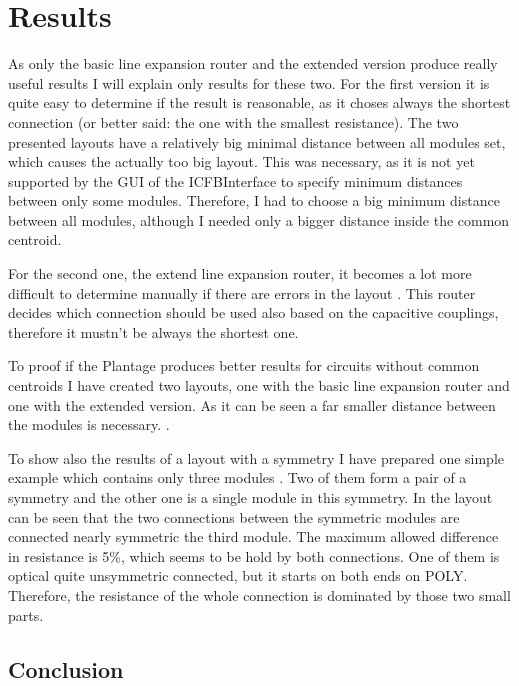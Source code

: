 \chapter{Results}
As only the basic line expansion router and the extended version produce really useful results I will explain only results for these two. For the first version  it is quite easy to determine if the result is reasonable, as it choses always the shortest connection (or better said: the one with the smallest resistance). The two presented layouts have a relatively big minimal distance between all modules set, which causes the actually too big layout. This was necessary, as it is not yet supported by the GUI of the ICFBInterface to specify minimum distances between only some modules. Therefore, I had to choose a big minimum distance between all modules, although I needed only a bigger distance inside the common centroid.

For the second one, the extend line expansion router, it becomes a lot more difficult to determine manually if there are errors in the layout . This router decides which connection should be used also based on the capacitive couplings, therefore it mustn't be always the shortest one.

To proof if the Plantage produces better results for circuits without common centroids I have created two layouts, one with the basic line expansion router and one with the extended version. As it can be seen a far smaller distance between the modules is necessary. .

To show also the results of a layout with a symmetry I have prepared one simple example which contains only three modules . Two of them form a pair of a symmetry and the other one is a single module in this symmetry. In the layout can be seen that the two connections between the symmetric modules are connected nearly symmetric the third module. The maximum allowed difference in resistance is 5\%, which seems to be hold by both connections. One of them is optical quite unsymmetric connected, but it starts on both ends on POLY. Therefore, the resistance of the whole connection is dominated by those two small parts.

\section{Conclusion}


